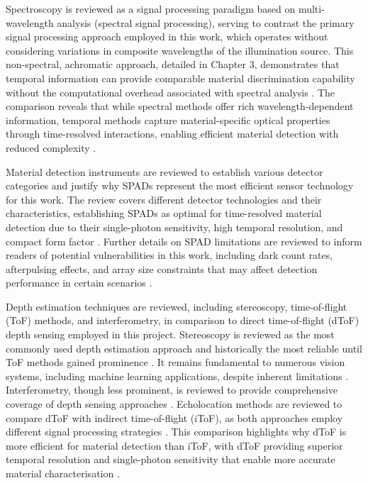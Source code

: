 \documentclass[12pt,a4paper,oneside]{report}
\begin{document}
Spectroscopy is reviewed as a signal processing paradigm based on multi-wavelength analysis (spectral signal processing), serving to contrast the primary signal processing approach employed in this work, which operates without considering variations in composite wavelengths of the illumination source. This non-spectral, achromatic approach, detailed in Chapter 3, demonstrates that temporal information can provide comparable material discrimination capability without the computational overhead associated with spectral analysis \cite{holt2016,elachi2021}. The comparison reveals that while spectral methods offer rich wavelength-dependent information, temporal methods capture material-specific optical properties through time-resolved interactions, enabling efficient material detection with reduced complexity \cite{su2016,becker2023,tafone2023}.

Material detection instruments are reviewed to establish various detector categories and justify why SPADs represent the most efficient sensor technology for this work. The review covers different detector technologies and their characteristics, establishing SPADs as optimal for time-resolved material detection due to their single-photon sensitivity, high temporal resolution, and compact form factor \cite{piron2020}. Further details on SPAD limitations are reviewed to inform readers of potential vulnerabilities in this work, including dark count rates, afterpulsing effects, and array size constraints that may affect detection performance in certain scenarios \cite{piron2020}.

Depth estimation techniques are reviewed, including stereoscopy, time-of-flight (ToF) methods, and interferometry, in comparison to direct time-of-flight (dToF) depth sensing employed in this project. Stereoscopy is reviewed as the most commonly used depth estimation approach and historically the most reliable until ToF methods gained prominence \cite{laga2022,hu2020,godard2019}. It remains fundamental to numerous vision systems, including machine learning applications, despite inherent limitations \cite{laga2022}. Interferometry, though less prominent, is reviewed to provide comprehensive coverage of depth sensing approaches \cite{huang1991,aumann2019}. Echolocation methods are reviewed to compare dToF with indirect time-of-flight (iToF), as both approaches employ different signal processing strategies \cite{bamji2022}. This comparison highlights why dToF is more efficient for material detection than iToF, with dToF providing superior temporal resolution and single-photon sensitivity that enable more accurate material characterisation \cite{su2016,becker2023}.
\end{document}
